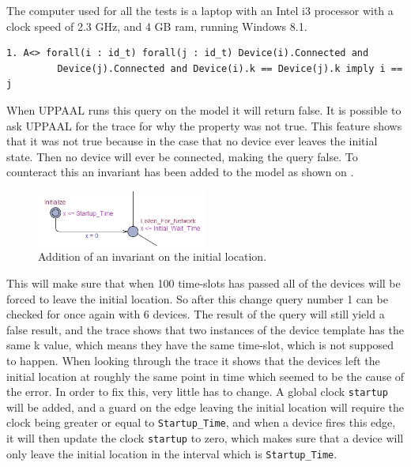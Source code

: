 The computer used for all the tests is a laptop with an Intel i3 processor with a clock speed of 2.3 GHz, and 4 GB ram, running Windows 8.1.

\noindent\begin{minipage}{\textwidth}
\begin{lstlisting}[style=UPPAAL, title={This query requires that eventually if all devices are connected, then no pair of devices have the same \texttt{k}, unless the pair consists of the same two devices.}]
1. A<> forall(i : id_t) forall(j : id_t) Device(i).Connected and
         Device(j).Connected and Device(i).k == Device(j).k imply i == j
\end{lstlisting}
\end{minipage}

\noindent
When UPPAAL runs this query on the model it will return false.
It is possible to ask UPPAAL for the trace for why the property was not true.
This feature shows that it was not true because in the case that no device ever leaves the initial state. 
Then no device will ever be connected, making the query false.
To counteract this an invariant has been added to the model as shown on .

\begin{figure}
  \includegraphics[width=0.5\textwidth]{Figures/Model/InvariantOnStartup.PNG} 
\caption{Addition of an invariant on the initial location.}
\label{UPPAALInvariant}
\end{figure}

This will make sure that when 100 time-slots has passed all of the devices will be forced to leave the initial location.
So after this change query number 1 can be checked for once again with 6 devices.
The result of the query will still yield a false result, and the trace shows that two instances of the device template has the same k value, which means they have the same time-slot, which is not supposed to happen.
When looking through the trace it shows that the devices left the initial location at roughly the same point in time which seemed to be the cause of the error.
In order to fix this, very little has to change.
A global clock \texttt{startup} will be added, and a guard on the edge leaving the initial location will require the clock being greater or equal to \texttt{Startup\_Time}, and when a device fires this edge, it will then update the clock \texttt{startup} to zero, which makes sure that a device will only leave the initial location in the interval which is \texttt{Startup\_Time}.

